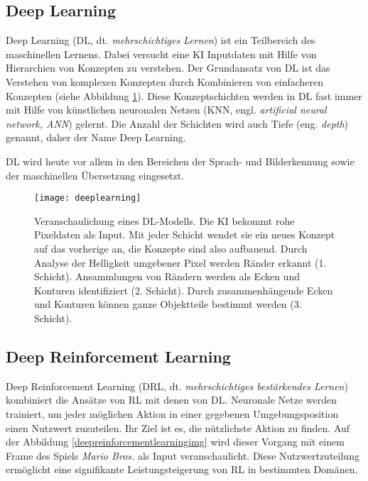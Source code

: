 \subsection{Deep Learning}
Deep Learning (DL, dt. \emph{mehrschichtiges Lernen}) ist ein Teilbereich des maschinellen Lernens. Dabei versucht eine KI Inputdaten mit Hilfe von Hierarchien von Konzepten zu verstehen. Der Grundansatz von DL ist das Verstehen von komplexen Konzepten durch Kombinieren von einfacheren Konzepten (siehe Abbildung \ref{deeplearningimg}). Diese Konzeptschichten werden in DL fast immer mit Hilfe von künstlichen neuronalen Netzen (KNN, engl. \emph{artificial neural network, ANN}) gelernt.  Die Anzahl der Schichten wird auch Tiefe (eng. \emph{depth}) genannt, daher der Name Deep Learning.

DL wird heute vor allem in den Bereichen der Sprach- und Bilderkennung sowie der maschinellen Übersetzung eingesetzt. 

\begin{figure}
  \texttt{[image: deeplearning]}
  \caption{Veranschaulichung eines DL-Modells. Die KI bekommt rohe Pixeldaten als Input. Mit jeder Schicht wendet sie ein neues Konzept auf das vorherige an, die Konzepte sind also aufbauend. Durch Analyse der Helligkeit umgebener Pixel werden Ränder erkannt (1. Schicht). Ansammlungen von Rändern werden als Ecken und Konturen identifiziert (2. Schicht). Durch zusammenhängende Ecken und Konturen können ganze Objektteile bestimmt werden (3. Schicht).  }
  \label{deeplearningimg}
\end{figure}
\subsection{Deep Reinforcement Learning}

Deep Reinforcement Learning (DRL, dt. \emph{mehrschichtiges bestärkendes Lernen}) kombiniert die Ansätze von RL mit denen von DL. Neuronale Netze werden trainiert, um jeder möglichen Aktion in einer gegebenen Umgebungsposition einen Nutzwert zuzuteilen. Ihr Ziel ist es, die nützlichste Aktion zu finden.  Auf der Abbildung \ref{deepreinforcementlearningimg} wird dieser Vorgang mit einem Frame des Spiels \emph{Mario Bros.} als Input veranschaulicht. Diese Nutzwertzuteilung ermöglicht eine signifikante Leistungsteigerung von RL in bestimmten Domänen.

